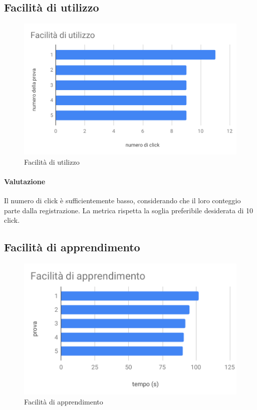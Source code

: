
\subsection{Facilità di utilizzo}
\begin{figure}[H]
	\centering
	\includegraphics[scale=0.6]{res/images/RA/facilita-di-utilizzo.pdf}
	\caption{Facilità di utilizzo}
\end{figure}
\paragraph*{Valutazione}
Il numero di click è sufficientemente basso, considerando che il loro conteggio parte dalla registrazione.
La metrica rispetta la soglia preferibile desiderata di 10 click.

\subsection{Facilità di apprendimento}
\begin{figure}[H]
	\centering
	\includegraphics[scale=0.7]{res/images/RA/facilita-di-apprendimento.pdf}
	\caption{Facilità di apprendimento}
\end{figure}
